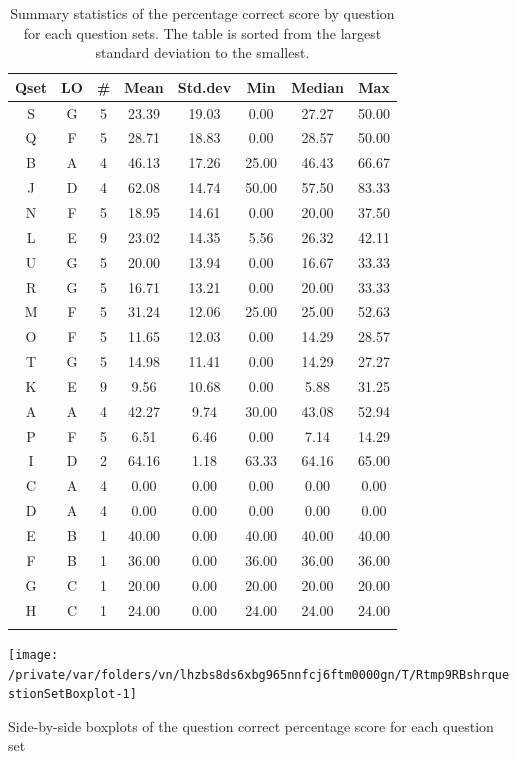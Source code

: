 \documentclass[12pt,english,nohyper]{tufte-handout}\usepackage[]{graphicx}\usepackage[]{color}
\newenvironment{knitrout}{}{} %
\begin{document}
\begin{longtable}{cc|ccc|ccc}
  \hline
Qset & LO & \# & Mean & Std.dev & Min & Median & Max \\ 
  \hline
S & G &   5 & 23.39 & 19.03 & 0.00 & 27.27 & 50.00 \\ 
  Q & F &   5 & 28.71 & 18.83 & 0.00 & 28.57 & 50.00 \\ 
  B & A &   4 & 46.13 & 17.26 & 25.00 & 46.43 & 66.67 \\ 
  J & D &   4 & 62.08 & 14.74 & 50.00 & 57.50 & 83.33 \\ 
  N & F &   5 & 18.95 & 14.61 & 0.00 & 20.00 & 37.50 \\ 
  L & E &   9 & 23.02 & 14.35 & 5.56 & 26.32 & 42.11 \\ 
  U & G &   5 & 20.00 & 13.94 & 0.00 & 16.67 & 33.33 \\ 
  R & G &   5 & 16.71 & 13.21 & 0.00 & 20.00 & 33.33 \\ 
  M & F &   5 & 31.24 & 12.06 & 25.00 & 25.00 & 52.63 \\ 
  O & F &   5 & 11.65 & 12.03 & 0.00 & 14.29 & 28.57 \\ 
  T & G &   5 & 14.98 & 11.41 & 0.00 & 14.29 & 27.27 \\ 
  K & E &   9 & 9.56 & 10.68 & 0.00 & 5.88 & 31.25 \\ 
  A & A &   4 & 42.27 & 9.74 & 30.00 & 43.08 & 52.94 \\ 
  P & F &   5 & 6.51 & 6.46 & 0.00 & 7.14 & 14.29 \\ 
  I & D &   2 & 64.16 & 1.18 & 63.33 & 64.16 & 65.00 \\ 
  C & A &   4 & 0.00 & 0.00 & 0.00 & 0.00 & 0.00 \\ 
  D & A &   4 & 0.00 & 0.00 & 0.00 & 0.00 & 0.00 \\ 
  E & B &   1 & 40.00 & 0.00 & 40.00 & 40.00 & 40.00 \\ 
  F & B &   1 & 36.00 & 0.00 & 36.00 & 36.00 & 36.00 \\ 
  G & C &   1 & 20.00 & 0.00 & 20.00 & 20.00 & 20.00 \\ 
  H & C &   1 & 24.00 & 0.00 & 24.00 & 24.00 & 24.00 \\ 
   \hline
\hline
\caption{Summary statistics of the percentage correct score by question for each question sets. The table is sorted from the largest standard deviation to the smallest.} 
\label{tab:QuestionSet_summary}
\end{longtable}


\begin{knitrout}
\color{fgcolor}\begin{marginfigure}

{\centering \texttt{[image: /private/var/folders/vn/lhzbs8ds6xbg965nnfcj6ftm0000gn/T/Rtmp9RBshrquestionSetBoxplot-1]} 

}

\caption[Side-by-side boxplots of the question correct percentage score for each question set]{Side-by-side boxplots of the question correct percentage score for each question set}\label{fig:questionSetBoxplot}
\end{marginfigure}


\end{knitrout}
\end{document}
